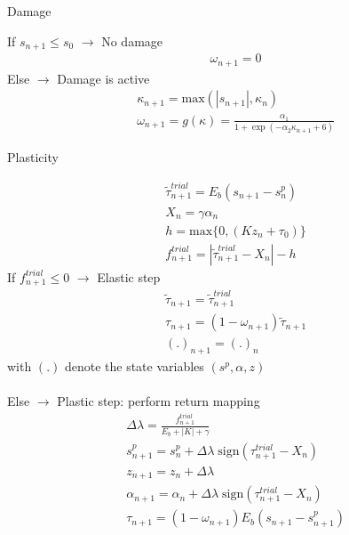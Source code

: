 \documentclass[main.tex]{subfiles}
\begin{document}
\begin{description}
  \item[Damage] 
\end{description}
If $s_{n+1} \leq s_0$ $\longrightarrow$ No damage \\
\begin{align*}
&\omega_{n+1} = 0 
\end{align*}
Else $\longrightarrow$ Damage is active \\
\begin{align*}
& \kappa_{n+1} = \mathrm{max}(|s_{n+1}|, \kappa_n)\\
& \omega_{n+1} = g(\kappa) = \frac{\alpha_1}{1 + \exp(-\alpha_2 \kappa_{n+1} + 6 )}
\end{align*}

\begin{description}
  \item[Plasticity] 
\end{description}

\begin{align*}
&\tilde{\tau}^{trial}_{n+1} = E_b (s_{n+1} - s^p_n)\\
&X_{n} = \gamma \alpha_n \\
&h = \mathrm{max}\{0 , (K z_n + \tau_0)\}\\
&f^{trial}_{n+1} = |\tilde{\tau}^{trial}_{n+1} - X_{n}| - h
\end{align*}
If $f^{trial}_{n+1} \leq 0$ $\longrightarrow$ Elastic step
\begin{align*}
&\tilde{\tau}_{n+1} = \tilde{\tau}^{trial}_{n+1}\\
&\tau_{n+1} = (1- \omega_{n+1}) \tilde{\tau}_{n+1} \\
&(.)_{n+1} = (.)_{n}
\end{align*}
with $(.)$ denote the state variables $(s^p, \alpha, z)$\\\\
Else $\longrightarrow$ Plastic step: perform return mapping
\begin{align*}
&\Delta \lambda = \frac{f^{trial}_{n+1}}{E_b + |K| + \gamma}\\
&s^p_{n+1} = s^p_{n} + \Delta \lambda \; \mathrm{sign}(\tau^{trial}_{n+1} - X_n)\\
&z_{n+1} = z_n + \Delta \lambda \\
&\alpha_{n+1} = \alpha_{n} + \Delta \lambda \;   \mathrm{sign}(\tau^{trial}_{n+1} - X_n)\\
& \tau_{n+1} = (1- \omega_{n+1}) E_b (s_{n+1} - s^p_{n+1})
\end{align*}

%
\end{document}
